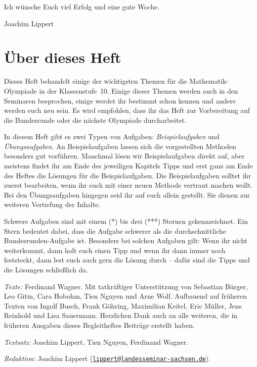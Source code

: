 \documentclass[a4paper, 12pt]{article}
\begin{document}
	Ich wünsche Euch viel Erfolg und eine gute Woche.
	
	Joachim Lippert
	
	\section*{Über dieses Heft}
	Dieses Heft behandelt einige der wichtigsten Themen für die Mathematik-Olympiade in der Klassenstufe~10. Einige dieser Themen werden auch in den Seminaren besprochen, einige werdet ihr bestimmt schon kennen und andere werden euch neu sein. Es wird empfohlen, dass ihr das Heft zur Vorbereitung auf die Bundesrunde oder die nächste Olympiade durcharbeitet.
	
	In diesem Heft gibt es zwei Typen von Aufgaben: \emph{Beispielaufgaben} und \emph{Übungsaufgaben}. An Beispielaufgaben lassen sich die vorgestellten Methoden besonders gut vorführen. Manchmal lösen wir Beispielaufgaben direkt auf, aber meistens findet ihr am Ende des jeweiligen Kapitels Tipps und erst ganz am Ende des Heftes die Lösungen für die Beispielaufgaben. Die Beispielaufgaben solltet ihr zuerst bearbeiten, wenn ihr euch mit einer neuen Methode vertraut machen wollt. Bei den Übungsaufgaben hingegen seid ihr auf euch allein gestellt. Sie dienen zur weiteren Vertiefung der Inhalte.
	
	Schwere Aufgaben sind mit einem (*) bis drei (***) Sternen gekennzeichnet. Ein Stern bedeutet dabei, dass die Aufgabe schwerer als die durchschnittliche Bundesrunden-Aufgabe ist. Besonders bei solchen Aufgaben gilt: Wenn ihr nicht weiterkommt, dann holt euch einen Tipp und wenn ihr dann immer noch feststeckt, dann lest euch auch gern die Lösung durch -- dafür sind die Tipps und die Lösungen schließlich da.
	
	
	\vfill
	
	\scriptsize
	
	\emph{Texte:} Ferdinand Wagner. Mit tatkräftiger Unterstützung von Sebastian Bürger, Leo Gitin, Cara Hobohm, Tien Nguyen und Arne Wolf. Aufbauend auf früheren Texten von Ingolf Busch, Frank Göhring, Maximilian Keitel, Eric Müller, Jens Reinhold und Lisa Sauermann. Herzlichen Dank auch an alle weiteren, die in früheren Ausgaben dieses Begleitheftes Beiträge erstellt haben.
	
	\emph{Textsatz:} Joachim Lippert, Tien Nguyen, Ferdinand Wagner.
	
	\emph{Redaktion}: Joachim Lippert (\href{mailto:lippert@landesseminar-sachsen.de}{\texttt{lippert@landesseminar-sachsen.de}}).
	\normalsize
	
\end{document}
